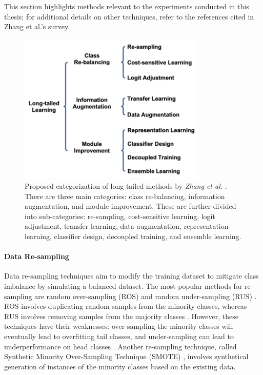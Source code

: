 This section highlights methods relevant to the experiments conducted in this thesis; for additional details on other techniques, refer to the references cited in Zhang et al.'s survey.

\begin{figure}[ht]
    \centering
    \includegraphics[width=0.8\textwidth]{Images/lt_methods_categories.png} 
    \caption{Proposed categorization of long-tailed methods by \emph{Zhang et al.} \cite{zhang2023deep}. There are three main categories: class re-balancing, information augmentation, and module improvement. These are further divided into sub-categories: re-sampling, cost-sensitive learning, logit adjustment, transfer learning, data augmentation, representation learning, classifier design, decoupled training, and ensemble learning.}
    \label{fig:lt_methods} 
\end{figure}


\paragraph{Data Re-sampling}
Data re-sampling techniques aim to modify the training dataset to mitigate class imbalance by simulating a balanced dataset. The most popular methods for re-sampling are random over-sampling (ROS) and random under-sampling (RUS) \cite{Chawla_2002}. ROS involves duplicating random samples from the minority classes, whereas RUS involves removing samples from the majority classes \cite{zhang2023deep}. However, these techniques have their weaknesses: over-sampling the minority classes will eventually lead to overfitting tail classes, and under-sampling can lead to underperformance on head classes \cite{zhang2023deep}. Another re-sampling technique, called Synthetic Minority Over-Sampling Technique (SMOTE) \cite{Chawla_2002}, involves synthetical generation of instances of the minority classes based on the existing data.

